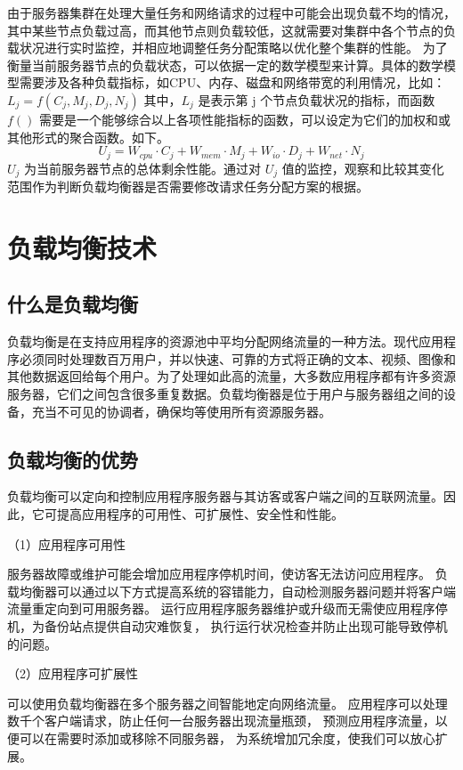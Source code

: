 由于服务器集群在处理大量任务和网络请求的过程中可能会出现负载不均的情况，其中某些节点负载过高，而其他节点则负载较低，这就需要对集群中各个节点的负载状况进行实时监控，并相应地调整任务分配策略以优化整个集群的性能。
为了衡量当前服务器节点的负载状态，可以依据一定的数学模型来计算。具体的数学模型需要涉及各种负载指标，如CPU、内存、磁盘和网络带宽的利用情况，比如：$L_{j} = f(C_{j}, M_{j}, D_{j}, N_{j})$ 其中，$ L_{j} $ 是表示第 j 个节点负载状况的指标，而函数 $f()$ 需要是一个能够综合以上各项性能指标的函数，可以设定为它们的加权和或其他形式的聚合函数。如下。
\[
	U_j = W_{cpu} \cdot C_j + W_{mem} \cdot M_j + W_{io} \cdot D_j + W_{net} \cdot N_j\tag{1.1}
\]
$U_j$ 为当前服务器节点的总体剩余性能。通过对 $U_j$ 值的监控，观察和比较其变化范围作为判断负载均衡器是否需要修改请求任务分配方案的根据。

\section{负载均衡技术}

\subsection{什么是负载均衡}

负载均衡是在支持应用程序的资源池中平均分配网络流量的一种方法。现代应用程序必须同时处理数百万用户，并以快速、可靠的方式将正确的文本、视频、图像和其他数据返回给每个用户。为了处理如此高的流量，大多数应用程序都有许多资源服务器，它们之间包含很多重复数据。负载均衡器是位于用户与服务器组之间的设备，充当不可见的协调者，确保均等使用所有资源服务器。

\subsection{负载均衡的优势}

负载均衡可以定向和控制应用程序服务器与其访客或客户端之间的互联网流量。因此，它可提高应用程序的可用性、可扩展性、安全性和性能。

（1）应用程序可用性

服务器故障或维护可能会增加应用程序停机时间，使访客无法访问应用程序。
负载均衡器可以通过以下方式提高系统的容错能力，自动检测服务器问题并将客户端流量重定向到可用服务器。
运行应用程序服务器维护或升级而无需使应用程序停机，为备份站点提供自动灾难恢复，
执行运行状况检查并防止出现可能导致停机的问题。

（2）应用程序可扩展性

可以使用负载均衡器在多个服务器之间智能地定向网络流量。
应用程序可以处理数千个客户端请求，防止任何一台服务器出现流量瓶颈，
预测应用程序流量，以便可以在需要时添加或移除不同服务器，
为系统增加冗余度，使我们可以放心扩展。

